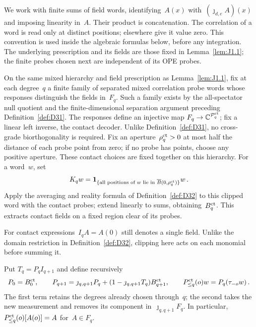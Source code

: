 We work with finite sums of field words, identifying~$A(x)$ with~$(\jmath_{d,e}A)(x)$ and imposing linearity in~$A$. Their product is concatenation. The correlation of a word is read only at distinct positions; elsewhere give it value zero. This convention is used inside the algebraic formulas below, before any integration. The underlying prescription and its fields are those fixed in Lemma~\ref{lem:J1.1}; the finite probes chosen next are independent of its OPE probes.

\begin{definition}\label{def:D36}
On the same mixed hierarchy and field prescription as Lemma~\ref{lem:J1.1}, fix at each degree~$q$ a finite family of separated mixed correlation probe words whose responses distinguish the fields in~$F_q$. Such a family exists by the all-spectator null quotient and the finite-dimensional separation argument preceding Definition~\ref{def:D31}. The responses define an injective map $F_q\to\mathbb{C}^{\mathcal P_q^{\rm ct}}$; fix a linear left inverse, the contact decoder. Unlike Definition~\ref{def:D31}, no cross-grade biorthogonality is required. Fix an aperture~$\rho_q^{\rm ct}>0$ at most half the distance of each probe point from zero; if no probe has points, choose any positive aperture. These contact choices are fixed together on this hierarchy. For a word~$w$, set
\begin{equation*}
K_qw=\mathbf1_{\{\text{all positions of }w\text{ lie in }\overline B(0,\rho_q^{\rm ct})\}}w\,.
\end{equation*}
Apply the averaging and reality formula of Definition~\ref{def:D32} to this clipped word with the contact probes; extend linearly to sums, obtaining~$B_q^{\rm ct}$. This extracts contact fields on a fixed region clear of its probes.
\end{definition}

For contact expressions~$I_qA=A(0)$ still denotes a single field. Unlike the domain restriction in Definition~\ref{def:D32}, clipping here acts on each monomial before summing it.

\begin{samepage}
\begin{definition}\label{def:D37}
Put $T_q=P_qI_{q+1}$ and define recursively
\begin{equation*}
P_0=B_0^{\rm ct},\qquad
P_{q+1}=\jmath_{q,q+1}P_q+(1-\jmath_{q,q+1}T_q)B_{q+1}^{\rm ct},\qquad
P_{\le q}^{\rm ct}(o)w=P_q(\tau_{-o}w)\,.
\end{equation*}
The first term retains the degrees already chosen through~$q$; the second takes the new measurement and removes its component in~$\jmath_{q,q+1}F_q$. In particular, $P_{\le q}^{\rm ct}(o)[A(o)]=A$ for~$A\in F_q$.
\end{definition}
\end{samepage}

